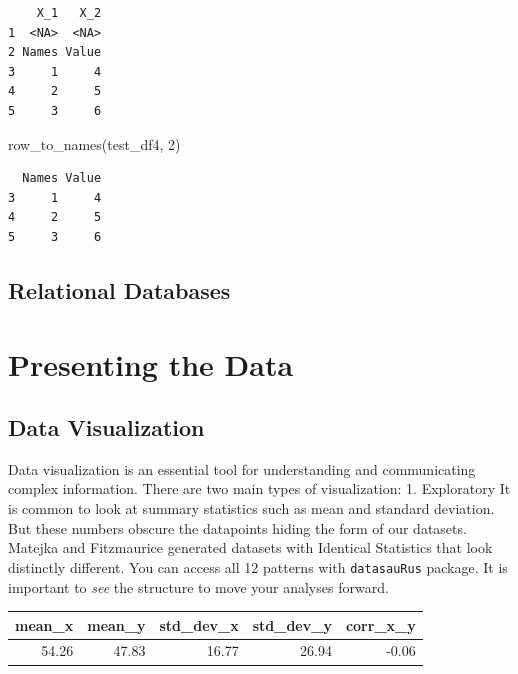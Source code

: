 \documentclass[
  letterpaper,
]{book}
\newenvironment{Shaded}{\begin{snugshade}}{\end{snugshade}}
\newcommand{\DecValTok}[1]{\textcolor[rgb]{0.68,0.00,0.00}{#1}}
\newcommand{\FunctionTok}[1]{\textcolor[rgb]{0.28,0.35,0.67}{#1}}
\newcommand{\NormalTok}[1]{\textcolor[rgb]{0.00,0.23,0.31}{#1}}
\begin{document}
\begin{verbatim}
    X_1   X_2
1  <NA>  <NA>
2 Names Value
3     1     4
4     2     5
5     3     6
\end{verbatim}

\begin{Shaded}
\begin{Highlighting}[]
\FunctionTok{row\_to\_names}\NormalTok{(test\_df4, }\DecValTok{2}\NormalTok{)}
\end{Highlighting}
\end{Shaded}

\begin{verbatim}
  Names Value
3     1     4
4     2     5
5     3     6
\end{verbatim}

\hypertarget{relational-databases}{%
\chapter{Relational Databases}\label{relational-databases}}

\part{Presenting the Data}

\hypertarget{data-visualization}{%
\chapter{Data Visualization}\label{data-visualization}}

Data visualization is an essential tool for understanding and
communicating complex information. There are two main types of
visualization: 1. Exploratory It is common to look at summary statistics
such as mean and standard deviation. But these numbers obscure the
datapoints hiding the form of our datasets. Matejka and Fitzmaurice
generated datasets with Identical Statistics that look distinctly
different. You can access all 12 patterns with \texttt{datasauRus}
package. It is important to \emph{see} the structure to move your
analyses forward.

\begin{tabular}{r|r|r|r|r}
\hline
mean\_x & mean\_y & std\_dev\_x & std\_dev\_y & corr\_x\_y\\
\hline
54.26 & 47.83 & 16.77 & 26.94 & -0.06\\
\hline
\end{tabular}
\end{document}
